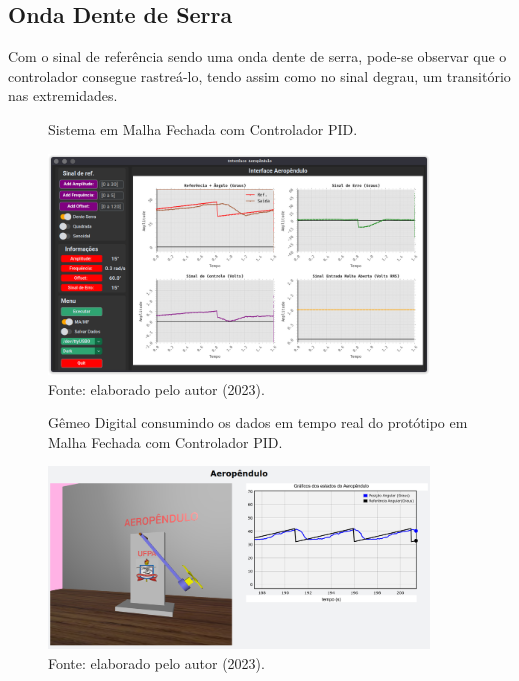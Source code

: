 \subsection{Onda Dente de Serra}

Com o sinal de referência sendo uma onda dente de serra, pode-se observar que o controlador consegue rastreá-lo, tendo assim como no sinal degrau, um transitório nas extremidades.

\begin{figure}[!h]
	\centering
	\caption{Sistema em Malha Fechada com Controlador PID.}
	\includegraphics[width=0.9\textwidth]{Capitulos/3_1_resultados_discurcao/3_figuras/mf_gui_den1.png}
	\caption*{Fonte: elaborado pelo autor (2023).}
	\label{fig3:image_26}
\end{figure}


\begin{figure}[!h]
	\centering
	\caption{Gêmeo Digital consumindo os dados em tempo real do protótipo em Malha Fechada com Controlador PID.}
	\includegraphics[width=0.9\textwidth]{Capitulos/3_1_resultados_discurcao/3_figuras/mf_gem_den1.png}
	\caption*{Fonte: elaborado pelo autor (2023).}
	\label{fig3:image_27}
\end{figure}



